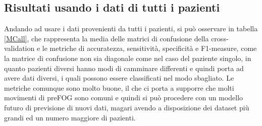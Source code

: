 \subsection{Risultati usando i dati di tutti i pazienti}
Andando ad usare i dati provenienti da tutti i pazienti, si può osservare in tabella \ref{MCall}, che rappresenta la media delle matrici di confusione della cross-validation e le metriche di accuratezza, sensitività, specificità e F1-measure, come la matrice di confusione non sia diagonale come nel caso del paziente singolo, in quanto pazienti diversi hanno modi di camminare differenti e quindi porta ad avere dati diversi, i quali possono essere classificati nel modo sbagliato. Le metriche comunque sono molto buone, il che ci porta a supporre che molti movimenti di preFOG sono comuni e quindi si può procedere con un modello futuro di previsione di nuovi dati, magari avendo a disposizione dei dataset più grandi ed un numero maggiore di pazienti.
\begin{table}[]
	\centering
	\caption{Matrice confusione e metriche di misura della cross-validation con i dati di tutti i pazienti}
	\label{MCall}
\end{table}
